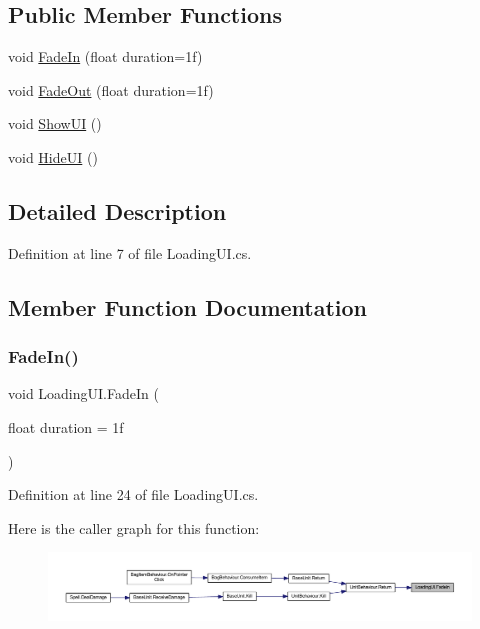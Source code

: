 \subsection*{Public Member Functions}
\begin{DoxyCompactItemize}
\item 
void \mbox{\hyperlink{class_loading_u_i_ada368f60f70e94bc04f0cbf47455306a}{Fade\+In}} (float duration=1f)
\item 
void \mbox{\hyperlink{class_loading_u_i_adaafb58a5d49b940e039bd307a67b2c9}{Fade\+Out}} (float duration=1f)
\item 
void \mbox{\hyperlink{class_loading_u_i_a117b66becd8ec50738d5bb53395c5638}{Show\+UI}} ()
\item 
void \mbox{\hyperlink{class_loading_u_i_a4b195dd7d9b45cbe16506f67e2d8bf10}{Hide\+UI}} ()
\end{DoxyCompactItemize}


\subsection{Detailed Description}


Definition at line 7 of file Loading\+U\+I.\+cs.



\subsection{Member Function Documentation}
\mbox{\label{class_loading_u_i_ada368f60f70e94bc04f0cbf47455306a}} 
\subsubsection{\texorpdfstring{FadeIn()}{FadeIn()}}
{\footnotesize\ttfamily void Loading\+U\+I.\+Fade\+In (\begin{DoxyParamCaption}\item[{float}]{duration = {\ttfamily 1f} }\end{DoxyParamCaption})}



Definition at line 24 of file Loading\+U\+I.\+cs.

Here is the caller graph for this function\+:
\nopagebreak
\begin{figure}[H]
\begin{center}
\leavevmode
\includegraphics[width=350pt]{class_loading_u_i_ada368f60f70e94bc04f0cbf47455306a_icgraph}
\end{center}
\end{figure}
\mbox{\label{class_loading_u_i_adaafb58a5d49b940e039bd307a67b2c9}} 

